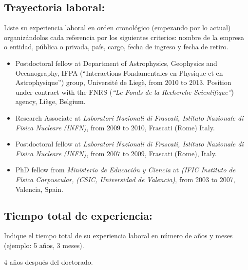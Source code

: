 \subsection{Trayectoria laboral:}
\begin{instrucciones}
  Liste su experiencia laboral en orden cronológico (empezando por lo
  actual) organizándolos cada referencia por los siguientes criterios:
  nombre de la empresa o entidad, pública o privada, país, cargo,
  fecha de ingreso y fecha de retiro.
\end{instrucciones}
\begin{itemize}
\item Postdoctoral fellow at Department of Astrophysics, Geophysics
  and Oceanography, IFPA (``Interactions Fondamentales en Physique et
  en Astrophysique'') group, Universit\'e de Lieg\`e, from 2010 to
  2013. Position under contract with the FNRS ({\it ``Le Fonds de la
    Recherche Scientifique''}) agency, Liège, Belgium.
\item Research Associate at {\it Laboratori Nazionali di
    Frascati, Istituto Nazionale di Fisica Nucleare (INFN)}, from
  2009 to 2010, Frascati (Rome) Italy.
\item Postdoctoral fellow at {\it Laboratori Nazionali di Frascati,
    Istituto Nazionale di Fisica Nucleare (INFN)}, from 2007 to 2009,
  Frascati (Rome), Italy.
\item PhD fellow from {{\it Ministerio de Educaci\'on y Ciencia}} at
  {\it (IFIC Instituto de F\'{\i}sica Corpuscular, (CSIC, Universidad
    de Valencia)}, from 2003 to 2007, Valencia, Spain.
\end{itemize}
\subsection{Tiempo total de experiencia:}
\begin{instrucciones}
  Indique el tiempo total de su experiencia laboral en número de años
  y meses (ejemplo: 5 años, 3 meses).
\end{instrucciones}
4 años después del doctorado.

